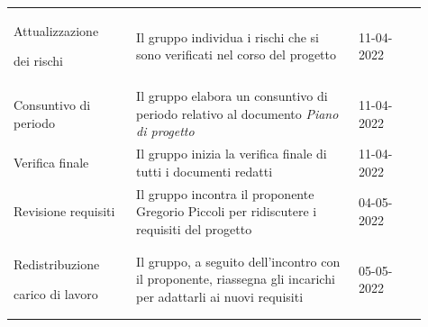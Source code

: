 {\begin{longtable}{p{0.27\linewidth}p{0.49\linewidth}p{0.15\linewidth}}
    \rowcolor[RGB]{216, 235, 171} 
    Attualizzazione \par dei rischi & Il gruppo individua i rischi che si sono verificati nel corso del progetto & 11-04-2022\\

    \rowcolor[RGB]{233, 245, 206} 
    Consuntivo di periodo & Il gruppo elabora un consuntivo di periodo relativo al documento \textit{Piano di progetto} & 11-04-2022\\

    \rowcolor[RGB]{216, 235, 171} 
    Verifica finale & Il gruppo inizia la verifica finale di tutti i documenti redatti & 11-04-2022\\

    \rowcolor[RGB]{233, 245, 206}
    Revisione requisiti & Il gruppo incontra il proponente Gregorio Piccoli per ridiscutere i requisiti del progetto  & 04-05-2022\\
    
    \rowcolor[RGB]{216, 235, 171} 
    Redistribuzione \par carico di lavoro & Il gruppo, a seguito dell'incontro con il proponente, riassegna gli incarichi per adattarli ai nuovi requisiti & 05-05-2022\\

\end{longtable}
}

